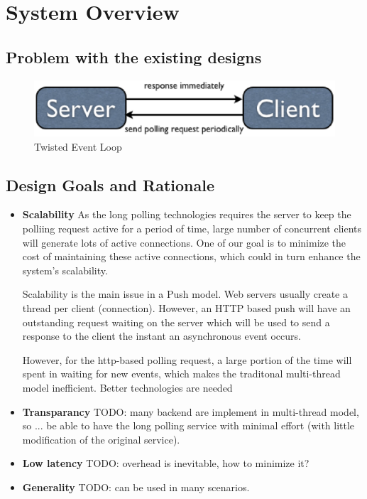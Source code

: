 \section {System Overview}
\subsection{Problem with the existing designs\\}
\begin{figure}[htb!]
\centering%
    \includegraphics[scale=0.45]{figures/client_poll.eps}
    \caption{Twisted Event Loop}
    \label{fig:Client Polling}
\end{figure}

\subsection{Design Goals and Rationale\\}

\begin{itemize}
\item {\bf Scalability}  
    As the long polling technologies requires the server to keep the polliing request active for a period of time,
    large number of concurrent clients will generate lots of active connections. One of our goal is to minimize the 
    cost of maintaining these active connections, which could in turn enhance the system's scalability.
     
    Scalability is the main issue in a Push model. Web servers usually create a thread per
    client (connection). However, an HTTP based push will have an
    outstanding request waiting on the server which will be used to send a response to the
    client the instant an asynchronous event occurs. 
    
    However, for the http-based polling request, a large portion of the time will spent in waiting for new events, which
    makes the traditonal multi-thread model inefficient. Better technologies are needed 

\item {\bf Transparancy} TODO: many backend are implement in multi-thread model, so ... be able to have the long polling service with minimal effort (with little modification of the original service).

\item {\bf Low latency} TODO: overhead is inevitable, how to minimize it?

\item {\bf Generality} TODO: can be used in many scenarios.

\end{itemize}


